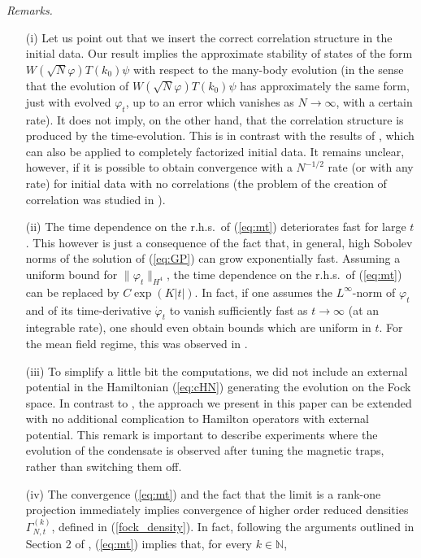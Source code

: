 \documentclass[11pt,a4paper]{article}
\newcommand{\bN}{{\mathbb N}}
\begin{document}
{\it Remarks.}
\begin{itemize}
\item[(i)] Let us point out that we insert the correct correlation structure in the initial data. Our result implies the approximate stability of states of the form $W(\sqrt{N} \varphi) T(k_0) \psi$ with respect to the many-body evolution (in the sense that the evolution of $W(\sqrt{N} \varphi) T(k_0) \psi$ has approximately the same form, just with evolved $\varphi_t$, up to an error which vanishes as $N\to \infty$, with a certain rate). It does not imply, on the other hand, that the correlation structure is produced by the time-evolution. This is in contrast with the results of \cite{ESY1,ESY2,ESY3,ESY4}, which can also be applied to completely factorized initial data. It remains unclear, however, if it is possible to obtain convergence with a $N^{-1/2}$ rate (or with any rate) for initial data with 
no correlations (the problem of the creation of correlation was studied in \cite{EMS}). 
\item[(ii)] The time dependence on the r.h.s.\ of (\ref{eq:mt}) deteriorates fast for large $t$. This however is just a consequence of the fact that, in general, high Sobolev norms of the solution of (\ref{eq:GP}) can grow exponentially fast. Assuming a uniform bound for $\| \varphi_t \|_{H^4}$, the time dependence on the r.h.s.\ of (\ref{eq:mt}) can be replaced by $C \exp (K |t|)$. In fact, if one assumes the $L^\infty$-norm of $\varphi_t$ and of its time-derivative $\dot\varphi_t$ to vanish sufficiently fast as $t \to \infty$ (at an integrable rate), one should even obtain bounds which are uniform in $t$. For the mean field regime, this was observed in \cite{KP2009}.
\item[(iii)] To simplify a little bit the computations, we did not include an external potential in the Hamiltonian (\ref{eq:cHN}) generating the evolution on the Fock space. In contrast to \cite{ESY1,ESY2,ESY3,ESY4}, the approach we present in this paper can be extended with no additional complication to Hamilton operators with external potential. This remark is important to describe experiments where the evolution of the condensate is observed after tuning the magnetic traps, rather than switching them off. 
\item[(iv)] The convergence (\ref{eq:mt}) and the fact that the limit is a rank-one projection immediately implies convergence of higher order reduced densities $\Gamma_{N,t}^{(k)}$, defined in (\ref{fock_density}). In fact, following the arguments outlined in Section 2 of \cite{KP2009}, (\ref{eq:mt}) implies that, for every $k \in \bN$,

\end{itemize}
\end{document}
